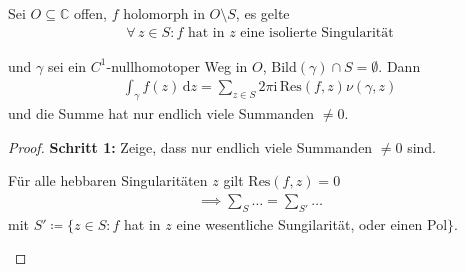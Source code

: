 \documentclass[a4paper,10pt]{scrbook}
\begin{document}
\begin{theorem}[Residuensatz]
  Sei $O \subseteq \mathbb{C}$ offen, $f$ holomorph in $O \setminus S$, es gelte
  \begin{align*}
    \forall \, z \in S : f \text{ hat in $z$ eine isolierte Singularität}
  \end{align*}

  und $\gamma$ sei ein $C^1$-nullhomotoper Weg in $O$, $\mathrm{Bild}(\gamma) \cap S = \emptyset$. Dann
  \begin{align*}
    \int_\gamma f(z) \, \mathrm{d}z = \sum\limits_{z \in S} 2 \pi \mathrm{i} \, \mathrm{Res}(f,z) \nu(\gamma,z)
  \end{align*}
  und die Summe hat nur endlich viele Summanden $\neq 0$.

  \begin{proof} %
    \textbf{Schritt 1:} Zeige, dass nur endlich viele Summanden $\neq 0$ sind.
    \begin{enum-alph}
      \item Für alle hebbaren Singularitäten $z$ gilt $\mathrm{Res}(f,z) = 0$
      \begin{align*}
        \implies \sum\limits_{S} \ldots = \sum\limits_{S'} \ldots
      \end{align*}
      mit $S' \coloneq \{z \in S : f$ hat in $z$ eine wesentliche Sungilarität, oder einen Pol$\}$.


\end{enum-alph}
\end{proof}
\end{theorem}
\end{document}
